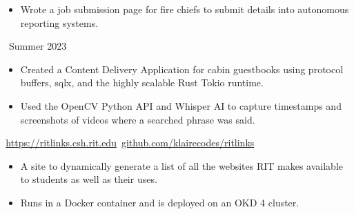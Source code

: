 \documentclass[11pt,letterpaper,ragged2e]{altacv}
\begin{document}
{
  \begin{itemize}
    \item Wrote a job submission page for fire chiefs to submit details into autonomous reporting systems.
  \end{itemize}
}
{\faCalendar\, Summer 2023}
{
}



{
  \begin{itemize}
    \item Created a Content Delivery Application for cabin guestbooks using protocol buffers, sqlx, and the highly scalable Rust Tokio runtime.
  \end{itemize}
}
{
}

{
  \begin{itemize}
    \item Used the OpenCV Python API and Whisper AI to capture timestamps and screenshots of videos where a searched phrase was said.
  \end{itemize}
}
{
}

{
  \faLink\,\href{https://ritlinks.csh.rit.edu}{https://ritlinks.csh.rit.edu}\quad
  \faGithub\,\href{https://github.com/klairecodes/ritlinks}{github.com/klairecodes/ritlinks}
}
{
  \begin{itemize}
    \item A site to dynamically generate a list of all the websites RIT makes available to students as well as their uses.
    \item Runs in a Docker container and is deployed on an OKD 4 cluster.
  \end{itemize}
}
{
}


\clearpage

\nocite{*}
\end{document}
